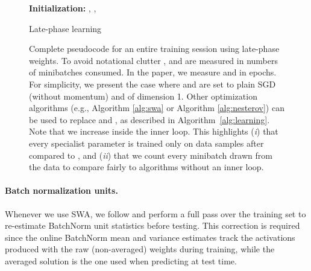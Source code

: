 \documentclass{article} \usepackage{iclr2021_conference,times}
\begin{document}
\begin{figure}[h!]
\centering
\begin{minipage}{0.8\textwidth}
    \begin{algorithm}[H]
      \textbf{Initialization:} , , \\
      
      \caption{Late-phase learning\label{alg:learning_2}}
     \end{algorithm}
 \hspace{0.5cm}
\end{minipage}
  \caption{Complete pseudocode for an entire training session using late-phase weights. To avoid notational clutter ,  and  are measured in numbers of minibatches consumed. In the paper, we measure  and  in epochs. For simplicity, we present the case where  and  are set to plain SGD (without momentum) and  of dimension 1. Other optimization algorithms (e.g., Algorithm \ref{alg:swa} or Algorithm \ref{alg:nesterov}) can be used to replace  and  , as described in Algorithm~\ref{alg:learning}. Note that we increase  inside the inner loop. This highlights  (\textit{i}) that
   every specialist parameter is trained only on  data samples after  compared to , and (\textit{ii}) that  we count every minibatch drawn from the data to compare fairly to algorithms without an inner loop.}
\end{figure}


\paragraph{Batch normalization units.} Whenever we use SWA, we follow \citet{izmailov_averaging_2018} and perform a full pass over the training set to re-estimate BatchNorm unit statistics before testing. This correction is required since the online BatchNorm mean and variance estimates track the activations produced with the raw (non-averaged) weights during training, while the averaged solution is the one used when predicting at test time.
\end{document}
